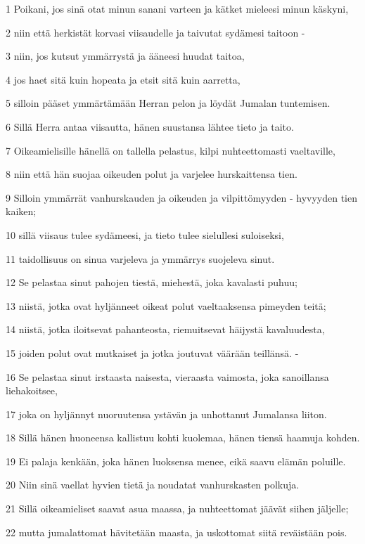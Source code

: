 \par 1 Poikani, jos sinä otat minun sanani varteen ja kätket mieleesi minun käskyni,
\par 2 niin että herkistät korvasi viisaudelle ja taivutat sydämesi taitoon -
\par 3 niin, jos kutsut ymmärrystä ja ääneesi huudat taitoa,
\par 4 jos haet sitä kuin hopeata ja etsit sitä kuin aarretta,
\par 5 silloin pääset ymmärtämään Herran pelon ja löydät Jumalan tuntemisen.
\par 6 Sillä Herra antaa viisautta, hänen suustansa lähtee tieto ja taito.
\par 7 Oikeamielisille hänellä on tallella pelastus, kilpi nuhteettomasti vaeltaville,
\par 8 niin että hän suojaa oikeuden polut ja varjelee hurskaittensa tien.
\par 9 Silloin ymmärrät vanhurskauden ja oikeuden ja vilpittömyyden - hyvyyden tien kaiken;
\par 10 sillä viisaus tulee sydämeesi, ja tieto tulee sielullesi suloiseksi,
\par 11 taidollisuus on sinua varjeleva ja ymmärrys suojeleva sinut.
\par 12 Se pelastaa sinut pahojen tiestä, miehestä, joka kavalasti puhuu;
\par 13 niistä, jotka ovat hyljänneet oikeat polut vaeltaaksensa pimeyden teitä;
\par 14 niistä, jotka iloitsevat pahanteosta, riemuitsevat häijystä kavaluudesta,
\par 15 joiden polut ovat mutkaiset ja jotka joutuvat väärään teillänsä. -
\par 16 Se pelastaa sinut irstaasta naisesta, vieraasta vaimosta, joka sanoillansa liehakoitsee,
\par 17 joka on hyljännyt nuoruutensa ystävän ja unhottanut Jumalansa liiton.
\par 18 Sillä hänen huoneensa kallistuu kohti kuolemaa, hänen tiensä haamuja kohden.
\par 19 Ei palaja kenkään, joka hänen luoksensa menee, eikä saavu elämän poluille.
\par 20 Niin sinä vaellat hyvien tietä ja noudatat vanhurskasten polkuja.
\par 21 Sillä oikeamieliset saavat asua maassa, ja nuhteettomat jäävät siihen jäljelle;
\par 22 mutta jumalattomat hävitetään maasta, ja uskottomat siitä reväistään pois.

